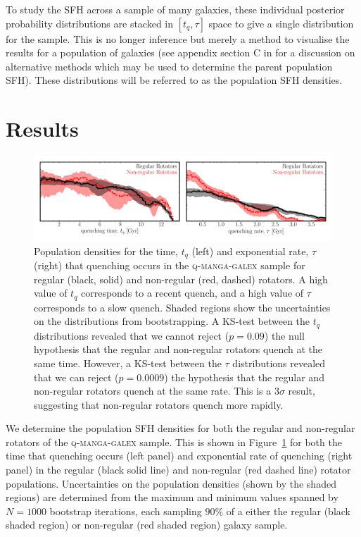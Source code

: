 \documentclass[useAMS,usenatbib]{mn2e}
\begin{document}
To study the SFH across a sample of many galaxies, these individual posterior probability distributions are stacked in $[t_q, \tau]$ space to give a single distribution for the sample. This is no longer inference but merely a method to visualise the results for a population of galaxies (see appendix section C in \citealt{smethurst16} for a discussion on alternative methods which may be used to determine the parent population SFH). These distributions will be referred to as the population SFH densities.

\section{Results}\label{sec:results}

\begin{figure}
\centering
\includegraphics[width=\textwidth]{../figures/quenching_time_rate_FR_SR_NSF_C16.pdf}
\caption{Population densities for the time, $t_q$ (left) and exponential rate, $\tau$ (right) that quenching occurs in the \textsc{q-manga-galex} sample for regular (black, solid) and non-regular (red, dashed) rotators. A high value of $t_q$ corresponds to a recent quench, and a high value of $\tau$ corresponds to a slow quench. Shaded regions show the uncertainties on the distributions from bootstrapping. A KS-test between the $t_q$ distributions revealed that we cannot reject ($p=0.09$) the null hypothesis that the regular and non-regular rotators quench at the same time. However, a KS-test between the $\tau$ distributions revealed that we can reject ($p=0.0009$) the hypothesis that the regular and non-regular rotators quench at the same rate. This is a $3\sigma$ result, suggesting that non-regular rotators quench more rapidly.}
\label{fig:popfrvsr}
\end{figure}

We determine the population SFH densities for both the regular and non-regular rotators of the \textsc{q-manga-galex} sample. This is shown in Figure~\ref{fig:popfrvsr} for both the time that quenching occurs (left panel) and exponential rate of quenching (right panel) in the regular (black solid line) and non-regular (red dashed line) rotator populations. Uncertainties on the population densities (shown by the shaded regions) are determined from the maximum and minimum values spanned by $N = 1000$ bootstrap iterations, each sampling $90\%$ of a either the regular (black shaded region) or non-regular (red shaded region) galaxy sample. 
\end{document}
